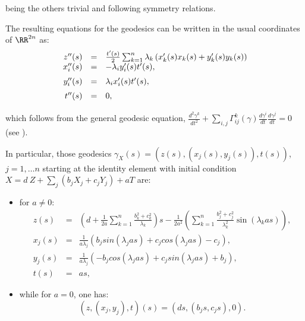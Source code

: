 \documentclass[12pt]{amsart}
\theoremstyle{plain}
\theoremstyle{definition}
\theoremstyle{remark}
\begin{document}
	being the others trivial and following  symmetry relations. 
	
	The resulting equations for the geodesics can be written in the usual  coordinates of $\RR^{2n}$ as:
	\begin{equation}\label{geodcomp}
		\begin{array}{rcl}
			z''(s)&= & \frac{ t'(s)}{2}\sum_{k=1}^{n}  \lambda_k \left( x_k'(s) x_k(s)+y_k'(s) y_k(s) \right) \\ \vspace{.2cm}
			x_i''(s)&=&-\lambda_i y_i'(s) t'(s),\\ \vspace{.2cm}
			y_i''(s)&=&\lambda_i x_i'(s) t'(s),\\ \vspace{.2cm}
			t''(s)&=&0,
		\end{array}
	\end{equation}
		which follows from the general geodesic equation, $\frac{d^2 \gamma^k}{d t^2} + \sum_{i,j} \Gamma^k_{i j}(\gamma) \frac{d \gamma^i}{dt} \frac{d \gamma^j}{dt} = 0$ (see \cite{ON}).
	
	
	
	In particular, those geodesics $\gamma_X(s)=(z(s), (x_j(s),y_j(s)),t(s))$, $j=1, \hdots n$ starting at the identity element  with initial condition $X =  d \ Z + \sum_j (b_j X_j + c_j Y_j) + a T$ are:
	
	\begin{itemize}
		\item for $a \neq 0$:
			\begin{eqnarray} \label{geo_osc_1}
			z(s)&= & \left(d + \frac{1}{2 a} \sum_{k=1}^{n} \frac{ b_{k}^{2}+c_k^{2}}{\lambda_k}\right)s- \frac{1}{2 a^{2}} \left(  \sum_{k=1}^{n} \frac{b_{j}^{2}+c_j^2}{\lambda_k^{2}} \sin(\lambda_k a s) \right),\\
			x_j(s)&=&  \frac{1}{a \lambda_j} \left(   {b_j}sin(\lambda_j a s)+{c_j}cos(\lambda_j a s)-{c_j} \right),\\
			y_j(s)&=&  \frac{1}{a \lambda_j}  \left(    -{b_j}cos(\lambda_j a s)+{c_j} sin(\lambda_j a s)+{b_j} \right),\\ 
			t(s)&=&a s,
		\end{eqnarray}
		\item while for $a=0$, one has:
		\begin{equation}\label{geo2}
			(z,(x_j,y_j),t)(s)=(ds,(b_j s,c_j s),0). 
		\end{equation}
		
	\end{itemize}
	
\end{document}
